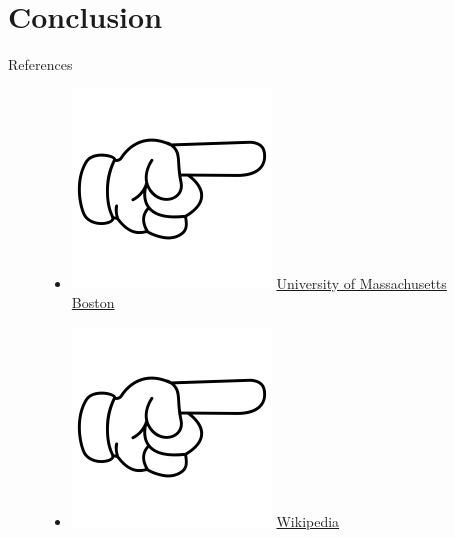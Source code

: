 \documentclass[
	11pt, 
]{beamer}
\begin{document}

\section{Conclusion}


\begin{frame}{References} 
    \begin{figure}
        \begin{itemize}
            \item[] \includegraphics[scale=0.1]{indicator.png} \href{https://www.cs.umb.edu/~poneil/lsmtree.pdf}{University of Massachusetts Boston}
            \item[] \includegraphics[scale=0.1]{indicator.png}  \href{https://en.wikipedia.org/wiki/Log-structured_merge-tree}{Wikipedia}
        \end{itemize}
    \end{figure}{}
\end{frame}{}
\end{document}
